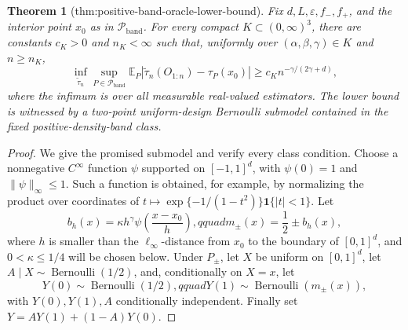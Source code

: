 \documentclass{article}
\newtheorem{theorem}{Theorem}
\begin{document}
\begin{theorem}[thm:positive-band-oracle-lower-bound]\label{thm:positive-band-oracle-lower-bound}
Fix \(d,L,\varepsilon,f_{-},f_{+}\), and the interior point \(x_0\) as in \(\mathcal P_{\mathrm{band}}\).  For every compact \(K\subset(0,\infty)^3\), there are constants \(c_K>0\) and \(n_K<\infty\) such that, uniformly over \((\alpha,\beta,\gamma)\in K\) and \(n\geq n_K\),
\[
 \inf_{\widetilde\tau_n}\sup_{P\in\mathcal P_{\mathrm{band}}}
 \mathbb E_P\left|\widetilde\tau_n(O_{1:n})-\tau_P(x_0)\right|
 \geq c_K n^{-\gamma/(2\gamma+d)},
\]
where the infimum is over all measurable real-valued estimators.  The lower bound is witnessed by a two-point uniform-design Bernoulli submodel contained in the fixed positive-density-band class.
\end{theorem}
\begin{proof}
We give the promised submodel and verify every class condition.  Choose a nonnegative \(C^\infty\) function \(\psi\) supported on \([-1,1]^d\), with \(\psi(0)=1\) and \(\|\psi\|_\infty\leq1\).  Such a function is obtained, for example, by normalizing the product over coordinates of \(t\mapsto \exp\{-1/(1-t^2)\}\mathbf 1\{|t|<1\}\).  Let
\[
 b_h(x)=\kappa h^\gamma\psi\left(\frac{x-x_0}{h}\right),qquad
 m_\pm(x)=\frac12\pm b_h(x),
\]
where \(h\) is smaller than the \(\ell_\infty\)-distance from \(x_0\) to the boundary of \([0,1]^d\), and \(0<\kappa\leq1/4\) will be chosen below.  Under \(P_\pm\), let \(X\) be uniform on \([0,1]^d\), let \(A\mid X\sim\operatorname{Bernoulli}(1/2)\), and, conditionally on \(X=x\), let
\[
 Y(0)\sim\operatorname{Bernoulli}(1/2),qquad
 Y(1)\sim\operatorname{Bernoulli}(m_\pm(x)),
\]
with \(Y(0),Y(1),A\) conditionally independent.  Finally set \(Y=AY(1)+(1-A)Y(0)\).


\end{proof}
\end{document}
